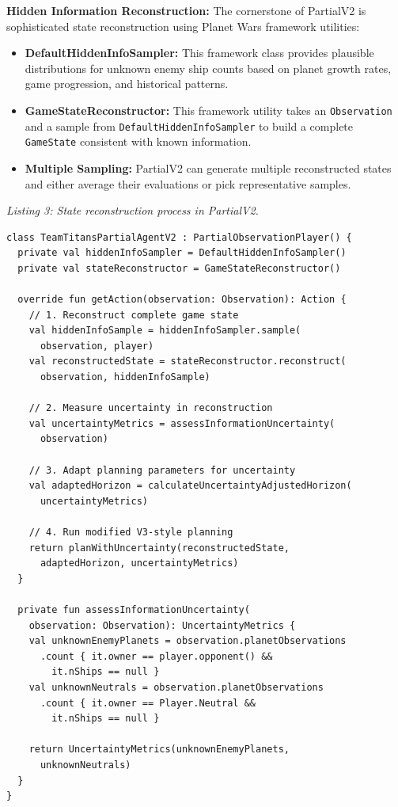 \documentclass[conference]{IEEEtran}
\begin{document}
\textbf{Hidden Information Reconstruction:} The cornerstone of PartialV2 is sophisticated state reconstruction using Planet Wars framework utilities:

\begin{itemize}
\item \textbf{DefaultHiddenInfoSampler:} This framework class provides plausible distributions for unknown enemy ship counts based on planet growth rates, game progression, and historical patterns.

\item \textbf{GameStateReconstructor:} This framework utility takes an \texttt{Observation} and a sample from \texttt{DefaultHiddenInfoSampler} to build a complete \texttt{GameState} consistent with known information.

\item \textbf{Multiple Sampling:} PartialV2 can generate multiple reconstructed states and either average their evaluations or pick representative samples.
\end{itemize}

\textit{Listing 3: State reconstruction process in PartialV2.}

\begin{scriptsize}
\raggedright
\begin{verbatim}
class TeamTitansPartialAgentV2 : PartialObservationPlayer() {
  private val hiddenInfoSampler = DefaultHiddenInfoSampler()
  private val stateReconstructor = GameStateReconstructor()
  
  override fun getAction(observation: Observation): Action {
    // 1. Reconstruct complete game state
    val hiddenInfoSample = hiddenInfoSampler.sample(
      observation, player)
    val reconstructedState = stateReconstructor.reconstruct(
      observation, hiddenInfoSample)
    
    // 2. Measure uncertainty in reconstruction
    val uncertaintyMetrics = assessInformationUncertainty(
      observation)
    
    // 3. Adapt planning parameters for uncertainty
    val adaptedHorizon = calculateUncertaintyAdjustedHorizon(
      uncertaintyMetrics)
    
    // 4. Run modified V3-style planning
    return planWithUncertainty(reconstructedState, 
      adaptedHorizon, uncertaintyMetrics)
  }
  
  private fun assessInformationUncertainty(
    observation: Observation): UncertaintyMetrics {
    val unknownEnemyPlanets = observation.planetObservations
      .count { it.owner == player.opponent() && 
        it.nShips == null }
    val unknownNeutrals = observation.planetObservations
      .count { it.owner == Player.Neutral && 
        it.nShips == null }
    
    return UncertaintyMetrics(unknownEnemyPlanets, 
      unknownNeutrals)
  }
}
\end{verbatim}
\end{scriptsize}
\end{document}
